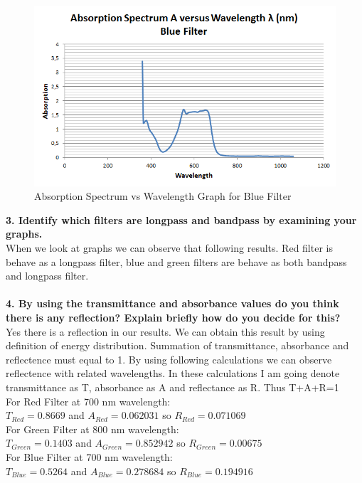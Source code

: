 \documentclass[a4paper,12pt]{report}
\begin{document}
\begin{figure}[h!]
\centering
\includegraphics[width=1.0\linewidth, height=0.4\textheight]{"Abs Blue"}
\caption{Absorption Spectrum vs Wavelength Graph for Blue Filter}
\label{fig:AbsBlue}
\end{figure}
\textbf{3. Identify which filters are longpass and bandpass by examining your graphs.}\\
When we look at graphs we can observe that following results. Red filter is behave as a longpass filter, blue and green filters are behave as both bandpass and longpass filter.\\\\
\textbf{4. By using the transmittance and absorbance values do you think there is any reflection? Explain briefly how do you decide for this?}\\
Yes there is a reflection in our results. We can obtain this result by using definition of energy distribution. Summation of transmittance, absorbance and reflectence must equal to 1. By using following calculations we can observe reflectence with related wavelengths. In these calculations I am going denote transmittance as T, absorbance as A and reflectance as R. Thus T+A+R=1\\
For Red Filter at 700 nm wavelength:\\
$T_{Red}=0.8669$  and  $A_{Red}=0.062031$ so $R_{Red}=0.071069$\\
For Green Filter at 800 nm wavelength:\\
$T_{Green}=0.1403$  and  $A_{Green}=0.852942$ so $R_{Green}=0.00675$\\
For Blue Filter at 700 nm wavelength:\\
$T_{Blue}=0.5264$  and  $A_{Blue}=0.278684$ so $R_{Blue}=0.194916$\\
\end{document}
